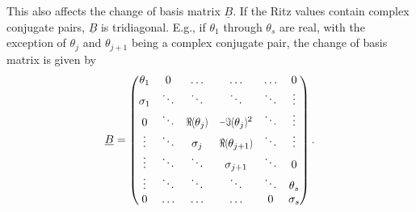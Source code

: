 \documentclass{scrartcl}
\numberwithin{equation}{section}
\begin{document}
This also affects the change of basis matrix $\underline{B}$. If the Ritz values contain complex conjugate pairs, $\underline{B}$ is tridiagonal. E.g., if $\theta_1$ through $\theta_s$ are real, with the exception of $\theta_j$ and $\theta_{j + 1}$ being a complex conjugate pair, the change of basis matrix is given by
\begin{equation*}
\iffalse
\begin{matrix}
\ddots & \ddots & \ddots & \ddots & \\
& \sigma_{j - 1} & $\scalebox{.7}[1]{$\Re$(}$ \theta_j$\scalebox{.7}[1]{$)$}$ & $\scalebox{.7}[1]{$-\Im($}$\theta_j$\scalebox{.7}[1]{$)$}$^2 & \\
& 0 & \sigma_j & $\scalebox{.7}[1]{$\Re$(}$ \theta_{j + 1}$\scalebox{.7}[1]{$)$}$ & \\
& & 0 & \sigma_{j + 1} & \\
& & \ddots & \ddots & \ddots \\
\end{matrix}
\fi
\underline{B} =
\begin{pmatrix}
\theta_1 & 0 & \ldots & \ldots & \ldots & 0 \\
\sigma_1 & \ddots & \ddots & \ddots & \ddots & \vdots \\
0 & \ddots & $\scalebox{.7}[1]{$\Re$(}$ \theta_j$\scalebox{.7}[1]{$)$}$ & $\scalebox{.7}[1]{$-\Im($}$\theta_j$\scalebox{.7}[1]{$)$}$^2 & \ddots & \vdots \\
\vdots & \ddots & \sigma_j & $\scalebox{.7}[1]{$\Re$(}$ \theta_{j + 1}$\scalebox{.7}[1]{$)$}$ & \ddots & \vdots \\
\vdots & \ddots & \ddots & \sigma_{j + 1} & \ddots & 0 \\
\vdots & \ddots & \ddots & \ddots & \ddots & \theta_s \\
0 & \ldots & \ldots & \ldots & 0 & \sigma_s \\
\end{pmatrix}.
\end{equation*}
\end{document}
